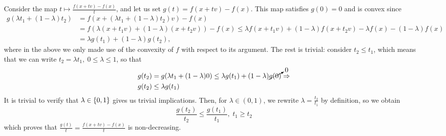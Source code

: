 \documentclass[10pt]{article}
\begin{document}
\begin{Exercise}

	\ExePart

	Consider the map $t \mapsto \frac{f(x + tv) - f(x)}{t}$, and let us set
	$g(t) = f(x + tv) - f(x)$. This map satisfies $g(0) = 0$ and is convex since
	\begin{align*}
		g(\lambda t_1 + (1 - \lambda) t_2) &=
		f\left(x + (\lambda t_1 + (1 - \lambda) t_2) v \right) - f(x) \\
		&= f(\lambda (x + t_1 v) + (1 - \lambda) (x + t_2 v)) - f(x)
		\leq \lambda f(x + t_1 v) + (1 - \lambda) f(x + t_2 v)
			- \lambda f(x) - (1 - \lambda) f(x) \\
		&= \lambda g(t_1) + (1 - \lambda) g(t_2),
	\end{align*}
	where in the above we only made use of the convexity of $f$ with respect to
	its argument. The rest is trivial: consider $t_2 \leq t_1$, which means that
	we can write $t_2 = \lambda t_1, \; 0 \leq \lambda \leq 1$, so that
	\begin{align*}
		g(t_2) &= g(\lambda t_1 + (1 - \lambda) 0) \leq
			\lambda g(t_1) + (1 - \lambda) \cancelto{0}{g(0)} \Rightarrow \\
			g(t_2) &\leq \lambda g(t_1)
	\end{align*}
	It is trivial to verify that $\lambda \in \left\{ 0, 1 \right\}$ gives us trivial
	implications. Then, for $\lambda \in (0, 1)$, we rewrite $\lambda =
	\frac{t_2}{t_1}$ by definition, so we obtain
	\[
		\frac{g(t_2)}{t_2} \leq \frac{g(t_1)}{t_1}, \; t_1 \geq t_2
	\]
	which proves that $\frac{g(t)}{t} = \frac{f(x + tv) - f(x)}{t}$ is
	non-decreasing.

	\ExePart


\end{Exercise}
\end{document}
